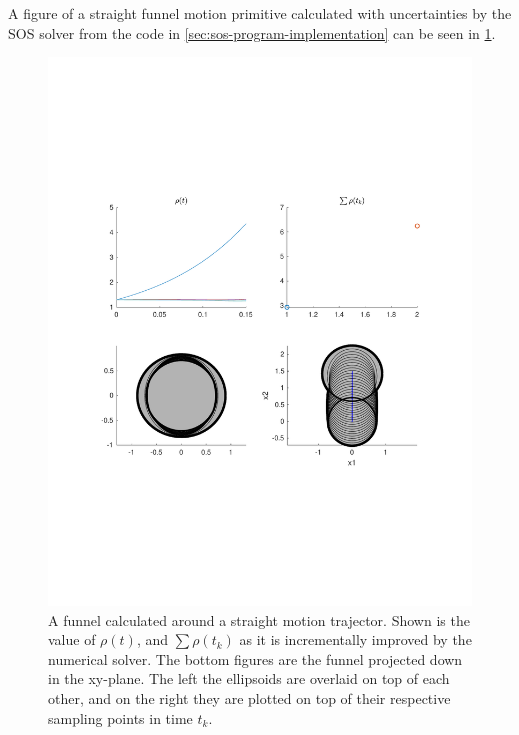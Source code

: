 A figure of a straight funnel motion primitive calculated with uncertainties by
the \ac{SOS} solver from the code in \cref{sec:sos-program-implementation} can
be seen in \cref{fig:funnel-calculation-visuals}.

\begin{figure}
  \centering \includegraphics[scale=.5, trim={0cm 6cm 0cm
    6cm}]{figures/method/funnel-calculation-visuals}
  \caption[A funnel calculated around a straight trajector]{A funnel calculated
    around a straight motion trajector. Shown is the value of \(\rho(t)\), and
    \(\sum \rho(t_k)\) as it is incrementally improved by the numerical solver.
    The bottom figures are the funnel projected down in the xy-plane. The left
    the ellipsoids are overlaid on top of each other, and on the right they are
    plotted on top of their respective sampling points in time \(t_k\).}
  \label{fig:funnel-calculation-visuals}
\end{figure}